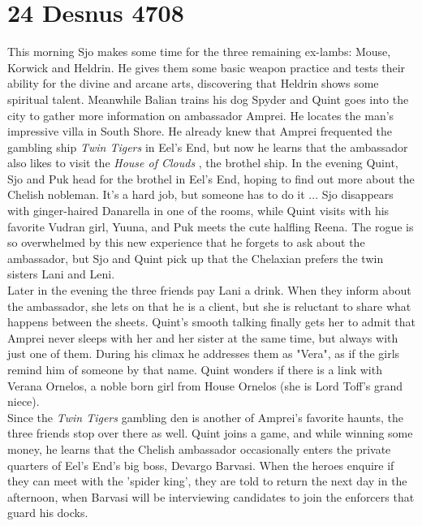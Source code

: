 \section{24 Desnus 4708}

This morning Sjo makes some time for the three remaining ex-lambs: Mouse, Korwick and Heldrin. He gives them some basic weapon practice and tests their ability for the divine and arcane arts, discovering that Heldrin shows some spiritual talent. Meanwhile Balian trains his dog Spyder and Quint goes into the city to gather more information on ambassador Amprei. He locates the man's impressive villa in South Shore. He already knew that Amprei frequented the gambling ship {\itshape Twin Tigers} in Eel's End, but now he learns that the ambassador also likes to visit the  {\itshape House of Clouds} , the brothel ship. In the evening Quint, Sjo and Puk head for the brothel in Eel's End, hoping to find out more about the Chelish nobleman. It's a hard job, but someone has to do it ... Sjo disappears with ginger-haired Danarella in one of the rooms, while Quint visits with his favorite Vudran girl, Yuuna, and Puk meets the cute halfling Reena. The rogue is so overwhelmed by this new experience that he forgets to ask about the ambassador, but Sjo and Quint pick up that the Chelaxian prefers the twin sisters Lani and Leni.\\

Later in the evening the three friends pay Lani a drink. When they inform about the ambassador, she lets on that he is a client, but she is reluctant to share what happens between the sheets. Quint's smooth talking finally gets her to admit that Amprei never sleeps with her and her sister at the same time, but always with just one of them. During his climax he addresses them as "Vera", as if the girls remind him of someone by that name. Quint wonders if there is a link with Verana Ornelos, a noble born girl from House Ornelos (she is Lord Toff's grand niece).\\

Since the {\itshape Twin Tigers} gambling den is another of Amprei's favorite haunts, the three friends stop over there as well. Quint joins a game, and while winning some money, he learns that the Chelish ambassador occasionally enters the private quarters of Eel's End's big boss, Devargo Barvasi. When the heroes enquire if they can meet with the 'spider king', they are told to return the next day in the afternoon, when Barvasi will be interviewing candidates to join the enforcers that guard his docks. 